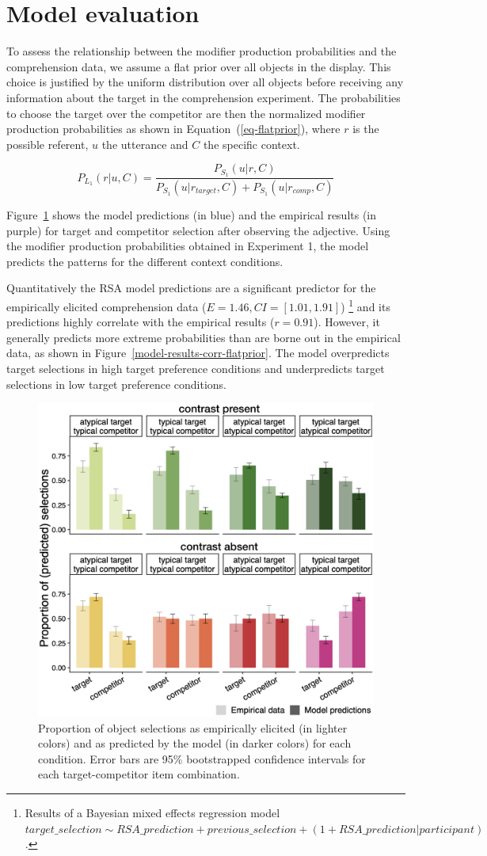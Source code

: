 \documentclass[10pt,letterpaper]{article}
\begin{document}
\section{Model evaluation}

To assess the relationship between the modifier production probabilities and the comprehension data, we assume a flat prior over all objects in the display. This choice is justified by the uniform distribution over all objects before receiving any information about the target in the comprehension experiment. The probabilities to choose the target over the competitor are then the normalized modifier production probabilities as shown in Equation~(\ref{eq-flatprior}), where $r$ is the possible referent, $u$ the utterance and $C$ the specific context.

\begin{equation}
	P_{L_1}(r|u,C) = \frac{P_{S_1}(u|r,C)}{P_{S_1}(u|r_{target},C) + P_{S_1}(u|r_{comp},C)}
\label{eq-flatprior}
\end{equation}

Figure~\ref{model-results-flatprior} shows the model predictions (in blue) and the empirical results (in purple) for target and competitor selection after observing the adjective. Using the modifier production probabilities obtained in Experiment 1, the model predicts the patterns for the different context conditions. 

Quantitatively the RSA model predictions are a significant predictor for the empirically elicited comprehension data ($E=1.46, CI=[1.01, 1.91]$)
\footnote{Results of a Bayesian mixed effects regression model $target\_selection \sim RSA\_prediction + previous\_selection + (1+RSA\_prediction|participant)$.} 
and its predictions highly correlate with the empirical results ($r=0.91$). However, it generally predicts more extreme probabilities than are borne out in the empirical data, as shown in Figure~\ref{model-results-corr-flatprior}. The model overpredicts target selections in high target preference conditions and underpredicts target selections in low target preference conditions. 

\begin{figure}
	\begin{center}
		\includegraphics[width=.475\textwidth]{graphs/model-bycond-paper.pdf}
	\end{center}
\caption{Proportion of object selections as empirically elicited (in lighter colors) and as predicted by the model (in darker colors) for each condition. Error bars are 95\% bootstrapped confidence intervals for each target-competitor item combination.} 
\label{model-results-flatprior}
\end{figure}
\end{document}
